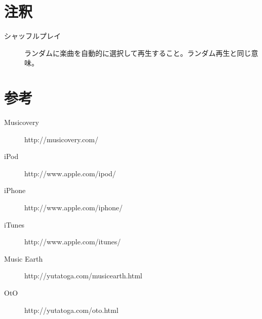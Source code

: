 \documentclass{jsarticle}
\begin{document}
\section{注釈}
\begin{description}
\item[シャッフルプレイ]
ランダムに楽曲を自動的に選択して再生すること。ランダム再生と同じ意味。

\end{description}

\section{参考}
\begin{description}
\item[Musicovery]
http://musicovery.com/
\item[iPod]
http://www.apple.com/ipod/
\item[iPhone]
http://www.apple.com/iphone/
\item[iTunes]
http://www.apple.com/itunes/
\item[Music Earth]
http://yutatoga.com/musicearth.html
\item[OtO]
http://yutatoga.com/oto.html

\end{description}
\end{document}
